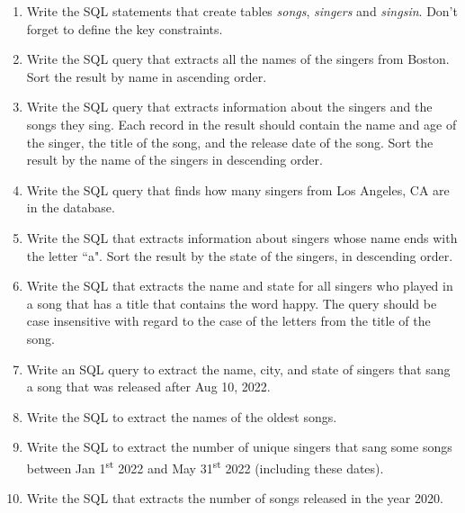 \documentclass[letterpaper, 11pt]{article}
\begin{document}
\begin{enumerate}[label={\alph*}),leftmargin=*]
    \item Write the SQL statements that create tables \textit{songs}, \textit{singers} and \textit{singsin}. Don’t forget to define the key constraints.
    \item Write the SQL query that extracts all the names of the singers from Boston. Sort the result by name in ascending order.
    \item Write the SQL query that extracts information about the singers and the songs they sing. Each record in the result should contain the name and age of the singer, the title of the song, and the release date of the song. Sort the result by the name of the singers in descending order.
    \item Write the SQL query that finds how many singers from Los Angeles, CA are in the database.
    \item Write the SQL that extracts information about singers whose name ends with the letter ``a". Sort the result by the state of the singers, in descending order.
    \item Write the SQL that extracts the name and state for all singers who played in a song that has a title that contains the word happy. The query should be case insensitive with regard to the case of the letters from the title of the song.
    \item Write an SQL query to extract the name, city, and state of singers that sang a song that was released after Aug 10, 2022.
    \item Write the SQL to extract the names of the oldest songs.
    \item Write the SQL to extract the number of unique singers that sang some songs between Jan 1\textsuperscript{st} 2022 and May 31\textsuperscript{st} 2022 (including these dates).
    \item Write the SQL that extracts the number of songs released in the year 2020.
\end{enumerate}
\end{document}
